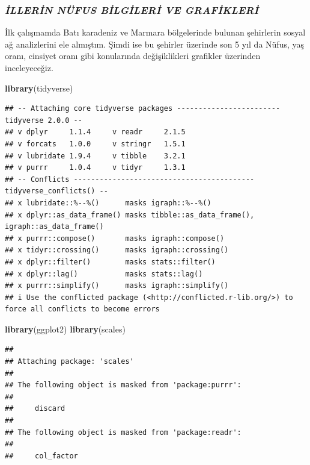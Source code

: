 \documentclass[
]{article}
\newenvironment{Shaded}{\begin{snugshade}}{\end{snugshade}}
\newcommand{\FunctionTok}[1]{\textcolor[rgb]{0.13,0.29,0.53}{\textbf{#1}}}
\newcommand{\NormalTok}[1]{#1}
\begin{document}
\subsubsection{\texorpdfstring{\textbf{\emph{İLLERİN NÜFUS BİLGİLERİ VE
GRAFİKLERİ}}}{İLLERİN NÜFUS BİLGİLERİ VE GRAFİKLERİ}}\label{illerin-nuxfcfus-bilgileri-ve-grafikleri}

İlk çalışmamda Batı karadeniz ve Marmara bölgelerinde bulunan şehirlerin
sosyal ağ analizlerini ele almıştım. Şimdi ise bu şehirler üzerinde son
5 yıl da Nüfus, yaş oranı, cinsiyet oranı gibi konularında
değişiklikleri grafikler üzerinden inceleyeceğiz.

\begin{Shaded}
\begin{Highlighting}[]
\FunctionTok{library}\NormalTok{(tidyverse)}
\end{Highlighting}
\end{Shaded}

\begin{verbatim}
## -- Attaching core tidyverse packages ------------------------ tidyverse 2.0.0 --
## v dplyr     1.1.4     v readr     2.1.5
## v forcats   1.0.0     v stringr   1.5.1
## v lubridate 1.9.4     v tibble    3.2.1
## v purrr     1.0.4     v tidyr     1.3.1
## -- Conflicts ------------------------------------------ tidyverse_conflicts() --
## x lubridate::%--%()      masks igraph::%--%()
## x dplyr::as_data_frame() masks tibble::as_data_frame(), igraph::as_data_frame()
## x purrr::compose()       masks igraph::compose()
## x tidyr::crossing()      masks igraph::crossing()
## x dplyr::filter()        masks stats::filter()
## x dplyr::lag()           masks stats::lag()
## x purrr::simplify()      masks igraph::simplify()
## i Use the conflicted package (<http://conflicted.r-lib.org/>) to force all conflicts to become errors
\end{verbatim}

\begin{Shaded}
\begin{Highlighting}[]
\FunctionTok{library}\NormalTok{(ggplot2)}
\FunctionTok{library}\NormalTok{(scales)}
\end{Highlighting}
\end{Shaded}

\begin{verbatim}
## 
## Attaching package: 'scales'
## 
## The following object is masked from 'package:purrr':
## 
##     discard
## 
## The following object is masked from 'package:readr':
## 
##     col_factor
\end{verbatim}
\end{document}
